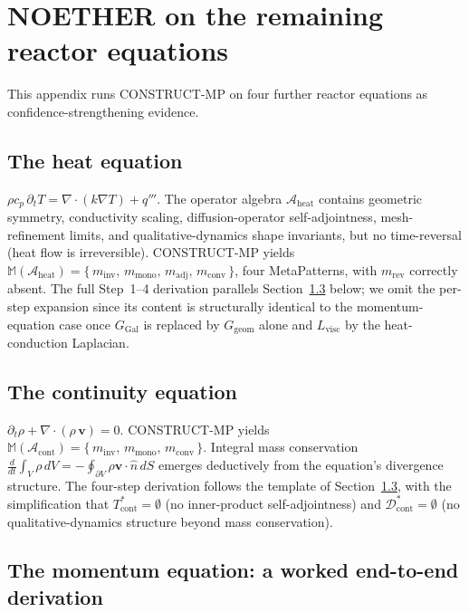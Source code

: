 \section{NOETHER on the remaining reactor equations}
\label{app:reactor-others}

This appendix runs CONSTRUCT-MP on four further reactor equations as confidence-strengthening evidence.

\subsection{The heat equation}

$\rho c_p\,\partial_t T = \nabla\!\cdot\!(k\nabla T) + q'''$. The operator algebra $\mathcal{A}_{\mathrm{heat}}$ contains geometric symmetry, conductivity scaling, diffusion-operator self-adjointness, mesh-refinement limits, and qualitative-dynamics shape invariants, but no time-reversal (heat flow is irreversible). CONSTRUCT-MP yields $\mathbb{M}(\mathcal{A}_{\mathrm{heat}}) = \{\,m_{\mathrm{inv}},\,m_{\mathrm{mono}},\,m_{\mathrm{adj}},\,m_{\mathrm{conv}}\,\}$, four MetaPatterns, with $m_{\mathrm{rev}}$ correctly absent. The full Step~1--4 derivation parallels Section~\ref{app:momentum} below; we omit the per-step expansion since its content is structurally identical to the momentum-equation case once $G_{\mathrm{Gal}}$ is replaced by $G_{\mathrm{geom}}$ alone and $L_{\mathrm{visc}}$ by the heat-conduction Laplacian.

\subsection{The continuity equation}

$\partial_t \rho + \nabla\!\cdot\!(\rho\,\mathbf{v}) = 0$. CONSTRUCT-MP yields $\mathbb{M}(\mathcal{A}_{\mathrm{cont}}) = \{\,m_{\mathrm{inv}},\,m_{\mathrm{mono}},\,m_{\mathrm{conv}}\,\}$. Integral mass conservation $\frac{d}{dt}\int_V \rho\,dV = -\oint_{\partial V} \rho\mathbf{v}\!\cdot\!\hat{n}\,dS$ emerges deductively from the equation's divergence structure. The four-step derivation follows the template of Section~\ref{app:momentum}, with the simplification that $T^{*}_{\mathrm{cont}} = \emptyset$ (no inner-product self-adjointness) and $\mathcal{D}^{*}_{\mathrm{cont}} = \emptyset$ (no qualitative-dynamics structure beyond mass conservation).

\subsection{The momentum equation: a worked end-to-end derivation}
\label{app:momentum}

